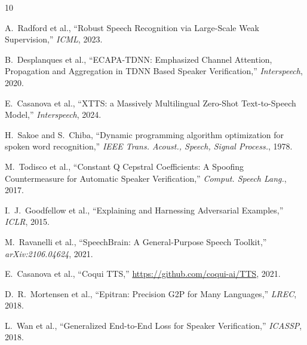 \documentclass[11pt]{article}
\begin{document}
\begin{thebibliography}{10}

A.~Radford et al.,
``Robust Speech Recognition via Large-Scale Weak Supervision,''
\textit{ICML}, 2023.

B.~Desplanques et al.,
``ECAPA-TDNN: Emphasized Channel Attention, Propagation and Aggregation
in TDNN Based Speaker Verification,''
\textit{Interspeech}, 2020.

E.~Casanova et al.,
``XTTS: a Massively Multilingual Zero-Shot Text-to-Speech Model,''
\textit{Interspeech}, 2024.

H.~Sakoe and S.~Chiba,
``Dynamic programming algorithm optimization for spoken word recognition,''
\textit{IEEE Trans. Acoust., Speech, Signal Process.}, 1978.

M.~Todisco et al.,
``Constant Q Cepstral Coefficients: A Spoofing Countermeasure for
Automatic Speaker Verification,''
\textit{Comput. Speech Lang.}, 2017.

I.~J.~Goodfellow et al.,
``Explaining and Harnessing Adversarial Examples,''
\textit{ICLR}, 2015.

M.~Ravanelli et al.,
``SpeechBrain: A General-Purpose Speech Toolkit,''
\textit{arXiv:2106.04624}, 2021.

E.~Casanova et al.,
``Coqui TTS,''
\url{https://github.com/coqui-ai/TTS}, 2021.

D.~R.~Mortensen et al.,
``Epitran: Precision G2P for Many Languages,''
\textit{LREC}, 2018.

L.~Wan et al.,
``Generalized End-to-End Loss for Speaker Verification,''
\textit{ICASSP}, 2018.

\end{thebibliography}
\end{document}
